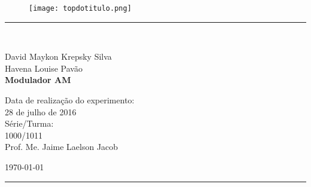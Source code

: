 \begin{titlepage}
\begin{center}
\begin{figure}[h]
\texttt{[image: topdotitulo.png]}
\end{figure}
\rule{\columnwidth}{1.5mm}
\

\large David Maykon Krepsky Silva\\
\large Havena Louise Pavão\\

\vspace{4cm}
{\bf \Large Modulador AM}
\vspace{3.5cm}

\begin{flushright}
Data de realização do experimento:\\
28 de julho de 2016\\
Série/Turma:\\
1000/1011\\
Prof. Me. Jaime Laelson Jacob 
\end{flushright}

\vspace{3.2cm}
\today

\rule{\columnwidth}{1.3mm}
\end{center}
\end{titlepage}